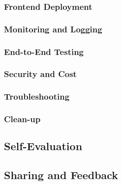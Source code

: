 \subsubsection{Frontend Deployment}


\subsubsection{Monitoring and Logging}


\subsubsection{End-to-End Testing}


\subsubsection{Security and Cost}


\subsubsection{Troubleshooting}


\subsubsection{Clean-up}


\newpage

\subsection{Self-Evaluation}



\newpage

\subsection{Sharing and Feedback}



\newpage

